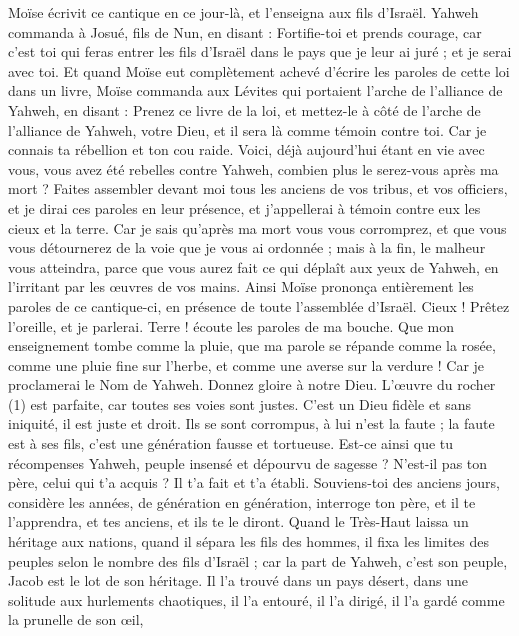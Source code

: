 \begin{multicols}{2}
Moïse écrivit ce cantique en ce jour-là, et l'enseigna aux fils d'Israël.
Yahweh commanda à Josué, fils de Nun, en disant : Fortifie-toi et prends courage, car c'est toi qui feras entrer les fils d'Israël dans le pays que je leur ai juré ; et je serai avec toi.
Et quand Moïse eut complètement achevé d'écrire les paroles de cette loi dans un livre,
Moïse commanda aux Lévites qui portaient l'arche de l'alliance de Yahweh, en disant :
Prenez ce livre de la loi, et mettez-le à côté de l'arche de l'alliance de Yahweh, votre Dieu, et il sera là comme témoin contre toi.
Car je connais ta rébellion et ton cou raide. Voici, déjà aujourd'hui étant en vie avec vous, vous avez été rebelles contre Yahweh, combien plus le serez-vous après ma mort ?
Faites assembler devant moi tous les anciens de vos tribus, et vos officiers, et je dirai ces paroles en leur présence, et j'appellerai à témoin contre eux les cieux et la terre.
Car je sais qu'après ma mort vous vous corromprez, et que vous vous détournerez de la voie que je vous ai ordonnée ; mais à la fin, le malheur vous atteindra, parce que vous aurez fait ce qui déplaît aux yeux de Yahweh, en l'irritant par les œuvres de vos mains.
Ainsi Moïse prononça entièrement les paroles de ce cantique-ci, en présence de toute l'assemblée d'Israël.
\VerseOne{}Cieux ! Prêtez l'oreille, et je parlerai. Terre ! écoute les paroles de ma bouche.
Que mon enseignement tombe comme la pluie, que ma parole se répande comme la rosée, comme une pluie fine sur l'herbe, et comme une averse sur la verdure !
Car je proclamerai le Nom de Yahweh. Donnez gloire à notre Dieu.
L'œuvre du rocher (1) est parfaite, car toutes ses voies sont justes. C’est un Dieu fidèle et sans iniquité, il est juste et droit.
Ils se sont corrompus, à lui n’est la faute ; la faute est à ses fils, c’est une génération fausse et tortueuse.
Est-ce ainsi que tu récompenses Yahweh, peuple insensé et dépourvu de sagesse ? N'est-il pas ton père, celui qui t'a acquis ? Il t'a fait et t'a établi.
Souviens-toi des anciens jours, considère les années, de génération en génération, interroge ton père, et il te l'apprendra, et tes anciens, et ils te le diront.
Quand le Très-Haut laissa un héritage aux nations, quand il sépara les fils des hommes, il fixa les limites des peuples selon le nombre des fils d'Israël ;
car la part de Yahweh, c'est son peuple, Jacob est le lot de son héritage.
Il l'a trouvé dans un pays désert, dans une solitude aux hurlements chaotiques, il l'a entouré, il l'a dirigé, il l'a gardé comme la prunelle de son œil,

\end{multicols}
